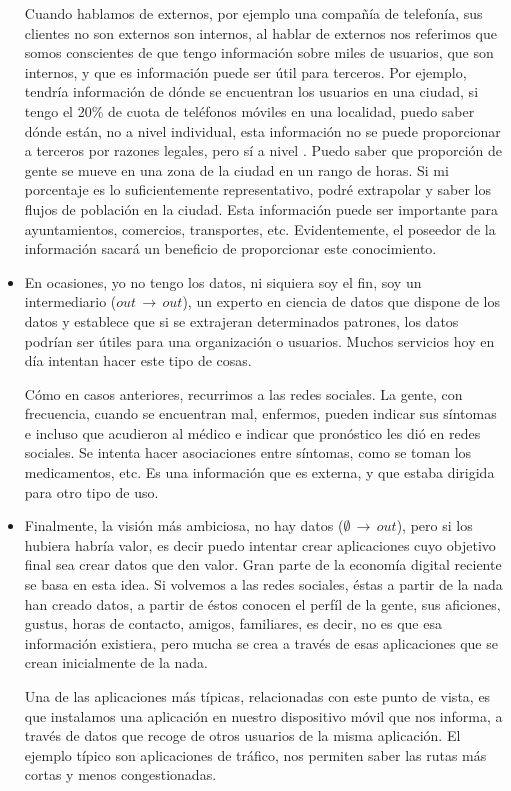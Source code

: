 \begin{itemize}
    Cuando hablamos de externos, por ejemplo una compañía de telefonía, sus clientes no son externos son internos, al hablar de externos nos referimos que somos conscientes de que tengo información sobre miles de usuarios, que son internos, y que es información puede ser útil para terceros. Por ejemplo, tendría información de dónde se encuentran los usuarios en una ciudad, si tengo el 20\% de cuota de teléfonos móviles en una localidad, puedo saber dónde están, no a nivel individual, esta información no se puede proporcionar a terceros por razones legales, pero sí a nivel . Puedo saber que proporción de gente se mueve en una zona de la ciudad en un rango de horas. Si mi porcentaje es lo suficientemente representativo, podré extrapolar y saber los flujos de población en la ciudad. Esta información puede ser importante para ayuntamientos, comercios, transportes, etc. Evidentemente, el poseedor de la información sacará un beneficio de proporcionar este conocimiento.

    \item En ocasiones, yo no tengo los datos, ni siquiera soy el fin, soy un intermediario ($out\,\rightarrow\,out$), un experto en ciencia de datos que dispone de los datos y establece que si se extrajeran determinados patrones, los datos podrían ser útiles para una organización o usuarios. Muchos servicios hoy en día intentan hacer este tipo de cosas.
    
    Cómo en casos anteriores, recurrimos a las redes sociales. La gente, con frecuencia, cuando se encuentran mal, enfermos, pueden indicar sus síntomas e incluso que acudieron al médico e indicar que pronóstico les dió en redes sociales. Se intenta hacer asociaciones entre síntomas, como se toman los medicamentos, etc. Es una información que es externa, y que estaba dirigida para otro tipo de uso.

    \item Finalmente, la visión más ambiciosa, no hay datos ($\emptyset\,\rightarrow\,out$), pero si los hubiera habría valor, es decir puedo intentar crear aplicaciones cuyo objetivo final sea crear datos que den valor. Gran parte de la economía digital reciente se basa en esta idea. Si volvemos a las redes sociales, éstas a partir de la nada han creado datos, a partir de éstos conocen el perfíl de la gente, sus aficiones, gustus, horas de contacto, amigos, familiares, es decir, no es que esa información existiera, pero mucha se crea a través de esas aplicaciones que se crean inicialmente de la nada.
    
    Una de las aplicaciones más típicas, relacionadas con este punto de vista, es que instalamos una aplicación en nuestro dispositivo móvil que nos informa, a través de datos que recoge de otros usuarios de la misma aplicación. El ejemplo típico son aplicaciones de tráfico, nos permiten saber las rutas más cortas y menos congestionadas.
\end{itemize}

